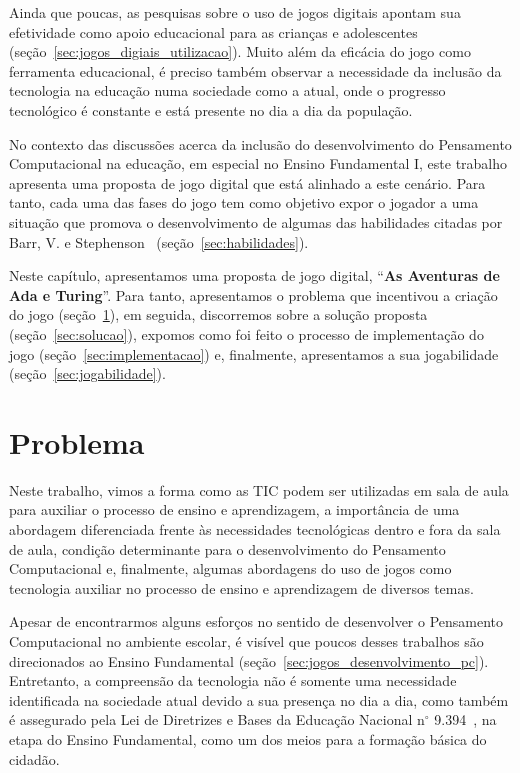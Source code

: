 Ainda que poucas, as pesquisas sobre o uso de jogos digitais apontam sua efetividade como apoio educacional para as crianças e adolescentes (seção~\ref{sec:jogos_digiais_utilizacao}). Muito além da eficácia do jogo como ferramenta educacional, é preciso também observar a necessidade da inclusão da tecnologia na educação numa sociedade como a atual, onde o progresso tecnológico é constante e está presente no dia a dia da população.

No contexto das discussões acerca da inclusão do desenvolvimento do Pensamento Computacional na educação, em especial no Ensino Fundamental I, este trabalho apresenta uma proposta de jogo digital que está alinhado a este cenário. Para tanto, cada uma das fases do jogo tem como objetivo expor o jogador a uma situação que promova o desenvolvimento de algumas das habilidades citadas por Barr, V. e Stephenson~\cite{barr_bringing_2011} (seção~\ref{sec:habilidades}).

Neste capítulo, apresentamos uma proposta de jogo digital, “\textbf{As Aventuras de Ada e Turing}”. Para tanto, apresentamos o problema que incentivou a criação do jogo (seção~\ref{sec:problema}), em seguida, discorremos sobre a solução proposta (seção~\ref{sec:solucao}), expomos como foi feito o processo de implementação do jogo (seção~\ref{sec:implementacao}) e, finalmente, apresentamos a sua jogabilidade (seção~\ref{sec:jogabilidade}).

\section{Problema} \label{sec:problema}

Neste trabalho, vimos a forma como as \acrlong{TIC} podem ser utilizadas em sala de aula para auxiliar o processo de ensino e aprendizagem, a importância de uma abordagem diferenciada frente às necessidades tecnológicas dentro e fora da sala de aula, condição determinante para o desenvolvimento do Pensamento Computacional e, finalmente, algumas abordagens do uso de jogos como tecnologia auxiliar no processo de ensino e aprendizagem de diversos temas.

Apesar de encontrarmos alguns esforços no sentido de desenvolver o Pensamento Computacional no ambiente escolar, é visível que poucos desses trabalhos são direcionados ao Ensino Fundamental (seção~\ref{sec:jogos_desenvolvimento_pc}). Entretanto, a compreensão da tecnologia não é somente uma necessidade identificada na sociedade atual devido a sua presença no dia a dia, como também é assegurado pela Lei de Diretrizes e Bases da Educação Nacional n$^{\circ}$ 9.394~\cite{brasil_lei_1996}, na etapa do Ensino Fundamental, como um dos meios para a formação básica do cidadão.

